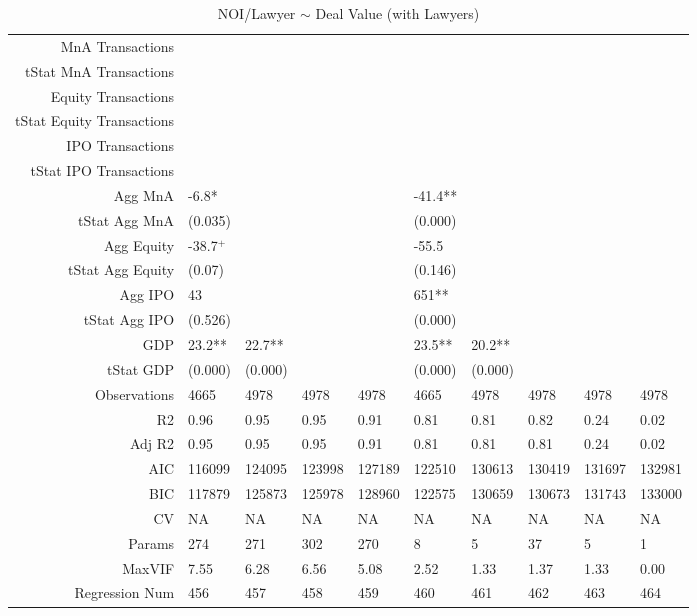 \begin{table}[ht]
\begin{tabular}{rlllllllll}
  MnA Transactions &  &  &  &  &  &  &  &  &  \\ 
  tStat MnA Transactions &  &  &  &  &  &  &  &  &  \\ 
  Equity Transactions &  &  &  &  &  &  &  &  &  \\ 
  tStat Equity Transactions &  &  &  &  &  &  &  &  &  \\ 
  IPO Transactions &  &  &  &  &  &  &  &  &  \\ 
  tStat IPO Transactions &  &  &  &  &  &  &  &  &  \\ 
  Agg MnA & -6.8* &  &  &  & -41.4** &  &  &  &  \\ 
  tStat Agg MnA & (0.035) &  &  &  & (0.000) &  &  &  &  \\ 
  Agg Equity & -38.7$^{+}$ &  &  &  & -55.5 &  &  &  &  \\ 
  tStat Agg Equity & (0.07) &  &  &  & (0.146) &  &  &  &  \\ 
  Agg IPO & 43 &  &  &  & 651** &  &  &  &  \\ 
  tStat Agg IPO & (0.526) &  &  &  & (0.000) &  &  &  &  \\ 
  GDP & 23.2** & 22.7** &  &  & 23.5** & 20.2** &  &  &  \\ 
  tStat GDP & (0.000) & (0.000) &  &  & (0.000) & (0.000) &  &  &  \\ 
  Observations & 4665 & 4978 & 4978 & 4978 & 4665 & 4978 & 4978 & 4978 & 4978 \\ 
  R2 & 0.96 & 0.95 & 0.95 & 0.91 & 0.81 & 0.81 & 0.82 & 0.24 & 0.02 \\ 
  Adj R2 & 0.95 & 0.95 & 0.95 & 0.91 & 0.81 & 0.81 & 0.81 & 0.24 & 0.02 \\ 
  AIC & 116099 & 124095 & 123998 & 127189 & 122510 & 130613 & 130419 & 131697 & 132981 \\ 
  BIC & 117879 & 125873 & 125978 & 128960 & 122575 & 130659 & 130673 & 131743 & 133000 \\ 
  CV & NA & NA & NA & NA & NA & NA & NA & NA & NA \\ 
  Params & 274 & 271 & 302 & 270 & 8 & 5 & 37 & 5 & 1 \\ 
  MaxVIF & 7.55 & 6.28 & 6.56 & 5.08 & 2.52 & 1.33 & 1.37 & 1.33 & 0.00 \\ 
  Regression Num & 456 & 457 & 458 & 459 & 460 & 461 & 462 & 463 & 464 \\ 
   \hline
\end{tabular}
\caption{NOI/Lawyer $\sim$ Deal Value (with Lawyers)} 
\end{table}
